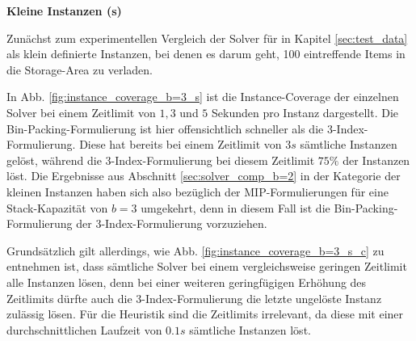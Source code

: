 \textbf{Kleine Instanzen (s)}

Zunächst zum experimentellen Vergleich der Solver für in Kapitel \ref{sec:test_data} als klein definierte
Instanzen, bei denen es darum geht, 100 eintreffende Items in die Storage-Area zu verladen.

In Abb. \ref{fig:instance_coverage_b=3_s} ist die Instance-Coverage der einzelnen Solver bei einem Zeitlimit von $1, 3$
und $5$ Sekunden pro Instanz dargestellt. Die Bin-Packing-Formulierung ist hier offensichtlich schneller als die 3-Index-Formulierung.
Diese hat bereits bei einem Zeitlimit von $3s$ sämtliche Instanzen gelöst, während die 3-Index-Formulierung
bei diesem Zeitlimit $75 \%$ der Instanzen löst. Die Ergebnisse aus Abschnitt \ref{sec:solver_comp_b=2} in der Kategorie der kleinen
Instanzen haben sich also bezüglich der MIP-Formulierungen für eine Stack-Kapazität von $b = 3$ umgekehrt, denn in diesem Fall
ist die Bin-Packing-Formulierung der 3-Index-Formulierung vorzuziehen.

Grundsätzlich gilt allerdings, wie Abb. \ref{fig:instance_coverage_b=3_s_c} zu entnehmen ist, dass sämtliche Solver
bei einem vergleichsweise geringen Zeitlimit alle Instanzen lösen, denn bei einer weiteren geringfügigen Erhöhung des Zeitlimits
dürfte auch die 3-Index-Formulierung die letzte ungelöste Instanz zulässig lösen.
Für die Heuristik sind die Zeitlimits irrelevant, da diese mit einer durchschnittlichen Laufzeit
von $0.1s$ sämtliche Instanzen löst.

